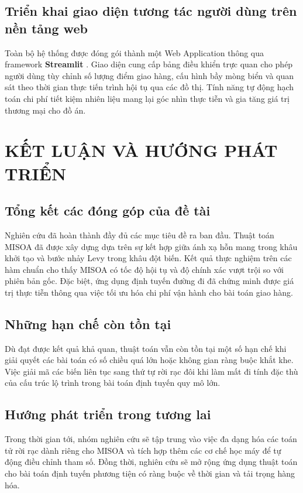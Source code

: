 \documentclass[12pt, a4paper]{article}
\begin{document}
\subsection{Triển khai giao diện tương tác người dùng trên nền tảng web}
Toàn bộ hệ thống được đóng gói thành một Web Application thông qua framework \textbf{Streamlit} \cite{streamlit}. Giao diện cung cấp bảng điều khiển trực quan cho phép người dùng tùy chỉnh số lượng điểm giao hàng, cấu hình bầy mòng biển và quan sát theo thời gian thực tiến trình hội tụ qua các đồ thị. Tính năng tự động hạch toán chi phí tiết kiệm nhiên liệu mang lại góc nhìn thực tiễn và gia tăng giá trị thương mại cho đồ án.

\newpage
\section{KẾT LUẬN VÀ HƯỚNG PHÁT TRIỂN}

\subsection{Tổng kết các đóng góp của đề tài}
Nghiên cứu đã hoàn thành đầy đủ các mục tiêu đề ra ban đầu. Thuật toán MISOA đã được xây dựng dựa trên sự kết hợp giữa ánh xạ hỗn mang trong khâu khởi tạo và bước nhảy Levy trong khâu đột biến. Kết quả thực nghiệm trên các hàm chuẩn cho thấy MISOA có tốc độ hội tụ và độ chính xác vượt trội so với phiên bản gốc. Đặc biệt, ứng dụng định tuyến đường đi đã chứng minh được giá trị thực tiễn thông qua việc tối ưu hóa chi phí vận hành cho bài toán giao hàng.

\subsection{Những hạn chế còn tồn tại}
Dù đạt được kết quả khả quan, thuật toán vẫn còn tồn tại một số hạn chế khi giải quyết các bài toán có số chiều quá lớn hoặc không gian ràng buộc khắt khe. Việc giải mã các biến liên tục sang thứ tự rời rạc đôi khi làm mất đi tính đặc thù của cấu trúc lộ trình trong bài toán định tuyến quy mô lớn.

\subsection{Hướng phát triển trong tương lai}
Trong thời gian tới, nhóm nghiên cứu sẽ tập trung vào việc đa dạng hóa các toán tử rời rạc dành riêng cho MISOA và tích hợp thêm các cơ chế học máy để tự động điều chỉnh tham số. Đồng thời, nghiên cứu sẽ mở rộng ứng dụng thuật toán cho bài toán định tuyến phương tiện có ràng buộc về thời gian và tải trọng hàng hóa.
\end{document}
